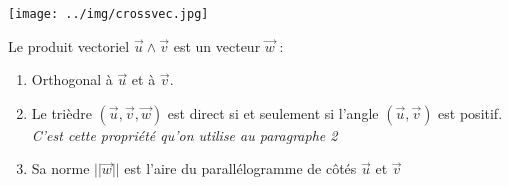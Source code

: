 \documentclass[a4paper]{article}
\begin{document}
\texttt{[image: ../img/crossvec.jpg]}

\bigskip
Le produit vectoriel $\vec{u} \wedge \vec{v}$ est un vecteur $\vec{w}$  :
\begin{enumerate}
\item Orthogonal à $\vec{u}$ et à $\vec{v}$. 
\item Le trièdre $(\vec{u}, \vec{v}, \vec{w})$ est direct si et seulement si l'angle $(\vec{u}, \vec{v})$ est positif. \textit{C'est cette propriété qu'on utilise au paragraphe 2}
\item Sa norme $||\vec{w}||$ est l'aire du parallélogramme de côtés $\vec{u}$ et $\vec{v}$
\end{enumerate}
\end{document}
